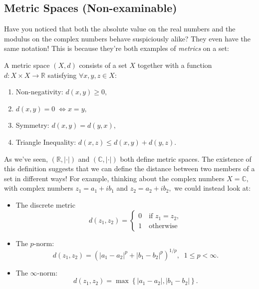 \documentclass[
  10pt,
  a4paper]{article}
\providecommand{\tightlist}{%
  \setlength{\itemsep}{0pt}\setlength{\parskip}{0pt}}
\theoremstyle{plain}
\theoremstyle{definition}
\theoremstyle{plain}
\theoremstyle{plain}
\theoremstyle{plain}
\theoremstyle{plain}
\theoremstyle{definition}
\theoremstyle{definition}
\theoremstyle{remark}
\theoremstyle{remark}
\let\BeginKnitrBlock\begin \let\EndKnitrBlock\end
\begin{document}
\hypertarget{metric-spaces-non-examinable}{%
\subsection{Metric Spaces (Non-examinable)}\label{metric-spaces-non-examinable}}

Have you noticed that both the absolute value on the real numbers and the modulus on the complex numbers behave suspiciously alike? They even have the same notation! This is because they're both examples of \emph{metrics} on a set:

\BeginKnitrBlock{definition}[Metric Space]
{\label{def:def3} }A metric space \((X,d)\) consists of a set \(X\) together with a function \(d: X\times X \to \mathbb{R}\) satisfying \(\forall x,y,z \in X:\)

\begin{enumerate}
\def\labelenumi{\roman{enumi})}
\tightlist
\item
  Non-negativity: \(d(x,y) \geq 0,\)
\item
  \(d(x,y) = 0 \; \Leftrightarrow x = y,\)
\item
  Symmetry: \(d(x,y) = d(y,x),\)
\item
  Triangle Inequality: \(d(x,z) \leq d(x,y) + d(y,z).\)
\end{enumerate}
\EndKnitrBlock{definition}

As we've seen, \((\mathbb{R}, \lvert \cdot \rvert)\) and \((\mathbb{C}, \lvert \cdot \rvert)\) both define metric spaces. The existence of this definition suggests that we can define the distance between two members of a set in different ways! For example, thinking about the complex numbers \(X = \mathbb{C},\) with complex numbers \(z_1 = a_1 + ib_1\) and \(z_2 = a_2 + ib_2,\) we could instead look at:

\begin{itemize}
\tightlist
\item
  The discrete metric \[d(z_1,z_2) = \begin{cases} 0 \quad \text{if $z_1=z_2$},\\
  1 \quad \text{otherwise}\end{cases}\]
\item
  The \(p\)-norm: \[d(z_1,z_2) = \left(\lvert a_1-a_2\rvert^p + \lvert b_1-b_2\rvert ^p\right)^{1/p},\;\; 1\leq p < \infty.\]
\item
  The \(\infty\)-norm: \[d(z_1,z_2) = \max\left\lbrace \lvert a_1 - a_2 \rvert, \lvert b_1 - b_2 \rvert\right\rbrace.\]
\end{itemize}
\end{document}
